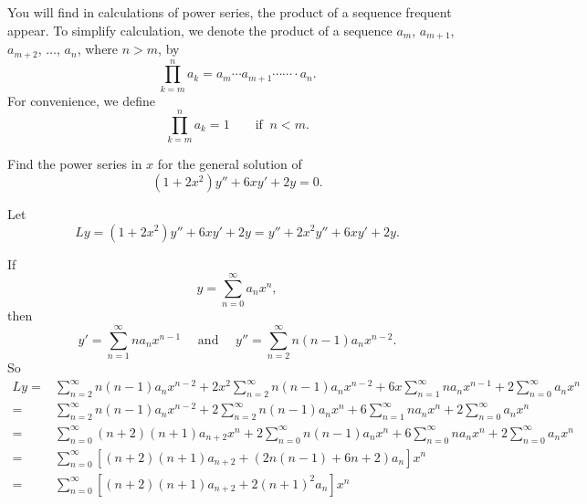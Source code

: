 You will find in calculations of power series, the product of a sequence frequent appear. To simplify calculation, we denote the product of a sequence $a_m$, $a_{m+1}$, $a_{m+2}$, $\dots$, $a_n$, where $n>m$, by
\[\prod\limits_{k=m}^na_k=a_m\cdots a_{m+1}\cdots\cdots\cdot a_n.\]
For convenience, we define
\[\prod\limits_{k=m}^na_k=1\qquad\text{if }~n<m.\]

\begin{example}
  Find the power series in $x$ for the general solution of
  \[(1+2x^2)y''+6xy'+2y=0.\]
\end{example}

\begin{solution}

Let
\[Ly=(1+2x^2)y''+6xy'+2y=y''+2x^2y''+6xy'+2y.\]

If 
\[y=\sum_{n=0}^\infty a_nx^n,\]
then
\[y'=\sum_{n=1}^\infty na_nx^{n-1}\quad\mbox{ and }\quad y''=\sum_{n=2}^\infty n(n-1)a_nx^{n-2}.\]
So
\[
  \begin{aligned} 
    Ly 
    =& \sum^\infty_{n=2}n(n-1)a_nx^{n-2} + 2x^2\sum^\infty_{n=2}n(n-1)a_nx^{n-2}+ 6x \sum^\infty_{n=1}na_nx^{n-1} + 2 \sum^\infty_{n=0}a_nx^n\\
    =& \sum^\infty_{n=2}n(n-1)a_nx^{n-2} + 2\sum^\infty_{n=2}n(n-1)a_nx^n+ 6\sum^\infty_{n=1}na_nx^n + 2\sum^\infty_{n=0}a_nx^n\\
    =& \sum^\infty_{n=0}(n+2)(n+1)a_{n+2}x^{n} + 2\sum^\infty_{n=0}n(n-1)a_nx^n+ 6\sum^\infty_{n=0}na_nx^n + 2\sum^\infty_{n=0}a_nx^n\\
    =& \sum^\infty_{n=0}\left[(n+2)(n+1)a_{n+2}+  (2n(n-1) + 6n + 2)a_n\right]x^n\\
    =& \sum^\infty_{n=0}\left[(n+2)(n+1)a_{n+2}+ 2(n+1)^2a_n\right]x^n
  \end{aligned}
\]


\end{solution}
